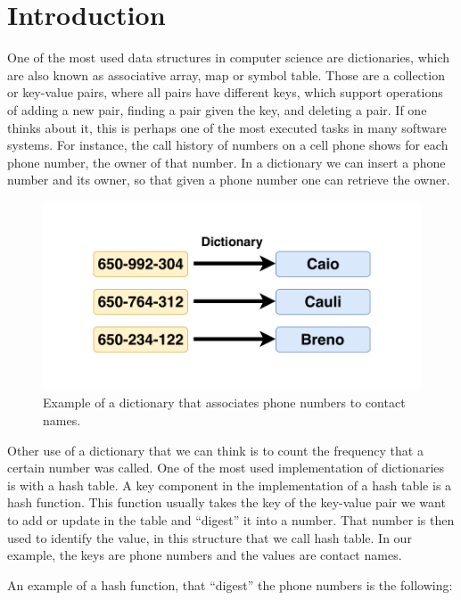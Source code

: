 \chapter{Introduction}
\label{cap:Introduction}

One of the most used data structures in computer science are dictionaries, which are also known as associative array, map or symbol table. Those are a collection or key-value pairs, where all pairs have different keys, which support operations of adding a new pair, finding a pair given the key, and deleting a pair. If one thinks about it, this is perhaps one of the most executed tasks in many software systems. For instance, the call history of numbers on a cell phone shows for each phone number, the owner of that number. In a dictionary we can insert a phone number and its owner, so that given a phone number one can retrieve the owner. 


\begin{figure}[h!]
  \centering
  \includegraphics[width=12cm]{figuras/dictionary-example.pdf}
  \caption{Example of a dictionary that associates phone numbers to contact names. }
\end{figure}

Other use of a dictionary that we can think is to count the frequency that a certain number was called. One of the most used implementation of dictionaries is with a hash table. A key component in the implementation of a hash table is a hash function. This function usually takes the key of the key-value pair we want to add or update in the table and ``digest'' it into a number. That number is then used to identify the value, in this structure that we call hash table. In our example, the keys are phone numbers and the values are contact names.

An example of a hash function, that ``digest'' the phone numbers is the following: \\

